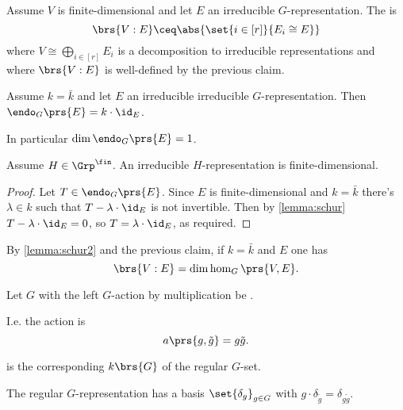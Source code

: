 \documentclass[10pt,a4paper,twoside,openany,hidelinks]{book}
\begin{document}
\begin{definition}
Assume $V$ is finite-dimensional and let $E$ an irreducible $G$-representation. The  is
\[\brs{V:E} \ceq \abs{\set{i \in [r]}{E_i \cong E}}\]
where $V \cong \bigoplus_{i \in [r]} E_i$ is a decomposition to irreducible representations and where $\brs{V:E}$ is well-defined by the previous claim.
\end{definition}

\begin{lemma}[Schur (2)] \label{lemma:schur2}
Assume $k = \bar{k}$ and let $E$ an irreducible irreducible $G$-representation. Then $\endo_G\prs{E} = k \cdot \id_E$.

In particular $\dim \endo_G\prs{E} = 1$.
\end{lemma}

\begin{exercise}
Assume $H \in \Grp^\fin$. An irreducible $H$-representation is finite-dimensional.
\end{exercise}

\begin{proof}
Let $T \in \endo_G\prs{E}$. Since $E$ is finite-dimensional and $k = \bar{k}$ there's $\lambda \in k$ such that $T - \lambda \cdot \id_E$ is not invertible. Then by \ref{lemma:schur}
$T - \lambda \cdot \id_E = 0$, so $T = \lambda \cdot \id_E$, as required.
\end{proof}

\begin{corollary}
By \ref{lemma:schur2} and the previous claim, if $k = \bar{k}$ and $E$ one has
\[\brs{V : E} = \dim \hom_G\prs{V,E} \text{.}\]
\end{corollary}

\begin{definition}
Let $G$ with the left $G$-action by multiplication be .

I.e. the action is
\[a\prs{g, \tilde{g}} = g \tilde{g} \text{.}\]
\end{definition}

\begin{definition}
 is the corresponding $k\brs{G}$ of the regular $G$-set.
\end{definition}

\begin{remark}
The regular $G$-representation has a basis $\set{\delta_g}_{g \in G}$ with $g \cdot \delta_{\tilde{g}} = \delta_{g \tilde{g}}$.
\end{remark}
\end{document}
